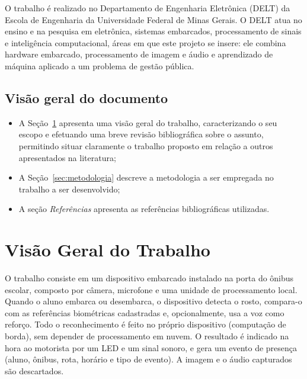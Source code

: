 \documentclass[
    12pt,
    oneside,
    a4paper,
    article,
    english,
    brazil
    ]{abntex2}
\begin{document}
O trabalho é realizado no Departamento de Engenharia Eletrônica (DELT) da
Escola de Engenharia da Universidade Federal de Minas Gerais. O DELT atua no ensino e na
pesquisa em eletrônica, sistemas embarcados, processamento de sinais e
inteligência computacional, áreas em que este projeto se insere: ele combina
hardware embarcado, processamento de imagem e áudio e aprendizado de máquina
aplicado a um problema de gestão pública.

\subsection{Visão geral do documento}

\begin{itemize}
    \item A Seção~\ref{sec:visao-geral} apresenta uma visão geral do trabalho,
          caracterizando o seu escopo e efetuando uma breve revisão bibliográfica
          sobre o assunto, permitindo situar claramente o trabalho proposto em
          relação a outros apresentados na literatura;
    \item A Seção~\ref{sec:metodologia} descreve a metodologia a ser empregada
          no trabalho a ser desenvolvido;
    \item A seção \textit{Referências} apresenta as referências bibliográficas
          utilizadas.
\end{itemize}

\section{Visão Geral do Trabalho}
\label{sec:visao-geral}

O trabalho consiste em um dispositivo embarcado instalado na porta do ônibus
escolar, composto por câmera, microfone e uma unidade de processamento local.
Quando o aluno embarca ou desembarca, o dispositivo detecta o rosto, compara-o
com as referências biométricas cadastradas e, opcionalmente, usa a voz como
reforço. Todo o reconhecimento é feito no próprio dispositivo (computação de
borda), sem depender de processamento em nuvem. O resultado é indicado na
hora ao motorista por um LED e um sinal sonoro, e gera um evento de
presença (aluno, ônibus, rota, horário e tipo de evento). A imagem e o áudio
capturados são descartados.
\end{document}
